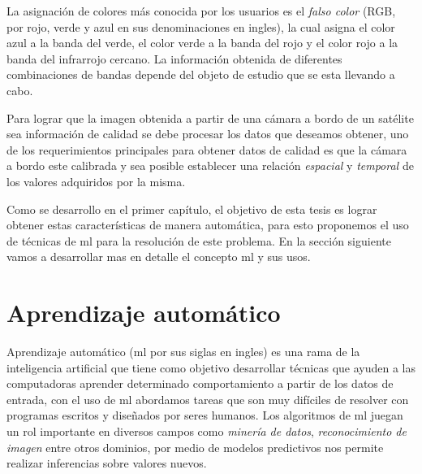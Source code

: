 La asignación de colores más conocida por los usuarios es el \textit{falso color} (RGB, por rojo, verde y azul en sus denominaciones en ingles), la cual asigna el color azul a la banda del verde, el color verde a la banda del rojo y el color rojo a la banda del infrarrojo cercano. La información obtenida de diferentes combinaciones de bandas depende del objeto de estudio que se esta llevando a cabo.


Para lograr que la imagen obtenida a partir de una cámara a bordo de un satélite sea información de calidad se debe procesar los datos que deseamos obtener, uno de los requerimientos principales para obtener datos de calidad es que la cámara a bordo este calibrada y sea posible establecer una relación \textit{espacial} y \textit{temporal} de los valores adquiridos por la misma.

Como se desarrollo en el primer capítulo, el objetivo de esta tesis es lograr obtener estas características de manera automática, para esto proponemos el uso de técnicas de \ac{ml} para la resolución de este problema. En la sección siguiente vamos a desarrollar mas en detalle  el concepto \ac{ml} y sus usos.




\section{Aprendizaje automático}\label{sec:machinelaerning}

Aprendizaje automático (\ac{ml} por sus siglas en ingles) es una rama de la inteligencia artificial que tiene como objetivo desarrollar técnicas que ayuden a las computadoras aprender determinado comportamiento a partir de los datos de entrada, con el uso de \ac{ml} abordamos tareas que son muy difíciles de resolver con programas escritos y diseñados por seres humanos. Los algoritmos de \ac{ml} juegan un rol importante en diversos campos como \textit{minería de datos}, \textit{reconocimiento de imagen} entre otros dominios, por medio de modelos predictivos nos permite realizar inferencias sobre valores nuevos. 

